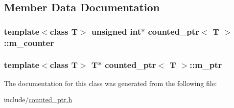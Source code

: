 \subsection{Member Data Documentation}
\hypertarget{classcounted__ptr_abf02f680f71697211394ebdfb47f14ff}{
\subsubsection[{m\-\_\-counter}]{\setlength{\rightskip}{0pt plus 5cm}template$<$class T$>$ unsigned int$\ast$ {\bf counted\-\_\-ptr}$<$ T $>$\-::m\-\_\-counter\hspace{0.3cm}{\ttfamily [private]}}}\label{classcounted__ptr_abf02f680f71697211394ebdfb47f14ff}
\hypertarget{classcounted__ptr_adfc589214b83bdd53c7640d8374f1098}{
\subsubsection[{m\-\_\-ptr}]{\setlength{\rightskip}{0pt plus 5cm}template$<$class T$>$ T$\ast$ {\bf counted\-\_\-ptr}$<$ T $>$\-::m\-\_\-ptr\hspace{0.3cm}{\ttfamily [private]}}}\label{classcounted__ptr_adfc589214b83bdd53c7640d8374f1098}


The documentation for this class was generated from the following file\-:\begin{DoxyCompactItemize}
\item 
include/\hyperlink{counted__ptr_8h}{counted\-\_\-ptr.\-h}\end{DoxyCompactItemize}
